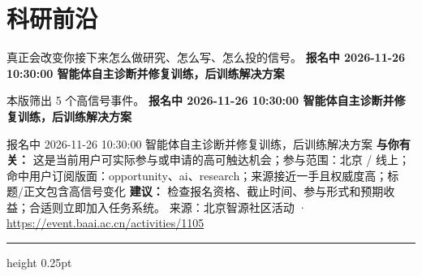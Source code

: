 \documentclass[10.5pt]{ctexart}
\begin{document}
\section*{科研前沿}
{\color{ormuted} 真正会改变你接下来怎么做研究、怎么写、怎么投的信号。}
\vspace{2mm}
{\LARGE\bfseries 报名中 2026-11-26 10:30:00 智能体自主诊断并修复训练，后训练解决方案}\par
\vspace{1mm}
{\color{ormuted} 本版筛出 5 个高信号事件。}
\vspace{3mm}
{\Large\bfseries 报名中 2026-11-26 10:30:00 智能体自主诊断并修复训练，后训练解决方案}\par
报名中 2026-11-26 10:30:00 智能体自主诊断并修复训练，后训练解决方案
\textbf{与你有关：} 这是当前用户可实际参与或申请的高可触达机会；参与范围：北京 / 线上；命中用户订阅版面：opportunity、ai、research；来源接近一手且权威度高；标题/正文包含高信号变化
\textbf{建议：} 检查报名资格、截止时间、参与形式和预期收益；合适则立即加入任务系统。
{\footnotesize\color{ormuted} 来源：北京智源社区活动 · \url{https://event.baai.ac.cn/activities/1105}}
\vspace{4mm}
\hrule height 0.25pt
\vspace{3mm}
\end{document}
